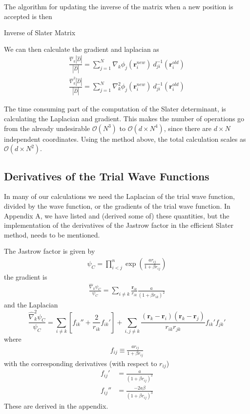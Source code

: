 \documentclass[twocolumns, a4paper,11pt,fleqn]{extarticle}
\newcommand{\eq}[1]{{\small\begin{align*}#1\end{align*}}}
\newcommand{\equ}[1]{{\small\begin{align}#1\end{align}}}
\renewcommand\vec[1]{\boldsymbol{\mathbf{#1}}}
\newcommand{\op}[1]{\hat{#1}}
\begin{document}
The algorithm for updating the inverse of the matrix 
when a new position is accepted is then

\begin{algorithm}
	\caption{Inverse of Slater Matrix}\label{algo1}
  \begin{algorithmic}[1]
      \State{$ S_j = \sum_{l=1}^N d_{il}(\vec r^{new}) d_{lj}^{-1}(\vec r^{old}) $}
    \EndFor
    \EndProcedure
    \EndProcedure
  \end{algorithmic}
\end{algorithm}

We can then calculate the gradient and laplacian as
\eq{
  \frac{\op\nabla_k |\op D|}{|\op D|} 
    = \sum_{j=1}^N \nabla_k \phi_j(\vec r_i^{new})\ d_{ji}^{-1} (\vec r_i^{old})\\
  \frac{\op\nabla_k^2 |\op D|}{|\op D|} 
    = \sum_{j=1}^N \nabla_k^2 \phi_j(\vec r_i^{new})\ d_{ji}^{-1} (\vec r_i^{old})
}

The time consuming part of the computation of the Slater determinant,
is calculating the Laplacian and gradient. This makes the
number of operations go from the already undesirable $\mathcal O(N^3)$ to
$\mathcal O(d\times N^4)$, since there are $d\times N$ independent coordinates.
Using the method above, the total calculation scales as
$\mathcal O(d\times N^2)$.

\subsection{Derivatives of the Trial Wave Functions}
In many of our calculations we need the Laplacian of the trial wave function,
divided by the wave function, or the gradients of the trial wave function.
In Appendix A, we have listed and (derived some of) these quantities,
but the implementation of the derivatives of
the Jastrow factor in the efficient Slater method, needs to be mentioned.

The Jastrow factor is given by
\equ{
  \psi_C = \prod_{i<j}^{n}\exp{\left(\frac{a r_{ij}}{1+\beta r_{ij}}\right)}
  \label{eq:psicor}
}
the gradient is
\eq{
  \frac{\op\nabla_k\psi_C}{\psi_C} =\sum_{i\neq k}\frac{\vec r_{ik}}{r_{ik}}\frac{a}{(1+\beta r_{ik})^2} 
}
and the Laplacian
{\tiny\begin{equation*}
  \frac{\op\nabla_k^2 \psi_C}{\psi_C}
    =\sum_{i\neq k}
    \left[f_{ik}''+ \frac{2}{r_{ik}}f_{ik}'\right]
    +
    \sum_{i,j\neq k}\frac{(\vec r_k-\vec r_i)(\vec r_k-\vec r_j)}{r_{ik} r_{jk}} 
    f_{ik}' f_{jk}'
\end{equation*}}%
where
\eq{
  f_{ij} \equiv \frac{ar_{ij}}{1+\beta r_{ij}}
}
with the corresponding derivatives (with respect to $r_{ij}$)
\eq{
  f_{ij}' &= \frac{a}{(1+\beta r_{ij})^2}\\
  f_{ij}'' &= \frac{-2a\beta}{(1+\beta r_{ij})^3}
}
These are derived in the appendix.
\end{document}
